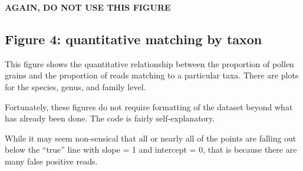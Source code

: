 \documentclass[
]{article}
\begin{document}
\textbf{AGAIN, DO NOT USE THIS FIGURE}

\hypertarget{figure-4-quantitative-matching-by-taxon}{%
\subsection{Figure 4: quantitative matching by
taxon}\label{figure-4-quantitative-matching-by-taxon}}

This figure shows the quantitative relationship between the proportion
of pollen grains and the proportion of reads matching to a particular
taxa. There are plots for the species, genus, and family level.

Fortunately, these figures do not require formatting of the dataset
beyond what has already been done. The code is fairly self-explanatory.

While it may seem non-sensical that all or nearly all of the points are
falling out below the ``true'' line with slope = 1 and intercept = 0,
that is because there are many false positive reads.
\end{document}
